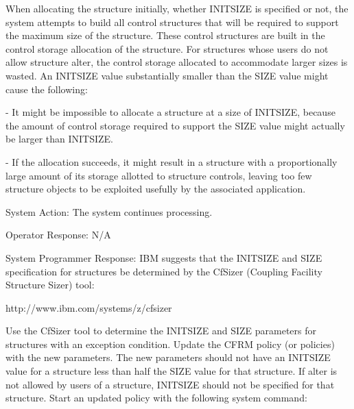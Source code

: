     When allocating the structure initially, whether INITSIZE is               
   specified or not, the system attempts to build all control                 
   structures that will be required to support the maximum size of the        
   structure. These control structures are built in the control storage       
   allocation of the structure. For structures whose users do not allow       
   structure alter, the control storage allocated to accommodate larger       
   sizes is wasted. An INITSIZE value substantially smaller than the          
   SIZE value might cause the following:                                      

     - It might be impossible to allocate a structure at a size of            
       INITSIZE, because the amount of control storage required to            
       support the SIZE value might actually be larger than INITSIZE.          

     - If the allocation succeeds, it might result in a structure with        
       a proportionally large amount of its storage allotted to               
       structure controls, leaving too few structure objects to be            
       exploited usefully by the associated application.                      

 System Action:  The system continues processing.                             

 Operator Response:  N/A                                                      

 System Programmer Response:  IBM suggests that the INITSIZE and SIZE         
   specification for structures be determined by the CfSizer (Coupling        
   Facility Structure Sizer) tool:                                            
                                                                               
      http://www.ibm.com/systems/z/cfsizer                                    

   Use the CfSizer tool to determine the INITSIZE and SIZE parameters         
   for structures with an exception condition. Update the CFRM policy         
   (or policies) with the new parameters. The new parameters should not       
   have an INITSIZE value for a structure less than half the SIZE value       
   for that structure. If alter is not allowed by users of a structure,       
   INITSIZE should not be specified for that structure. Start an              
   updated policy with the following system command:                          

